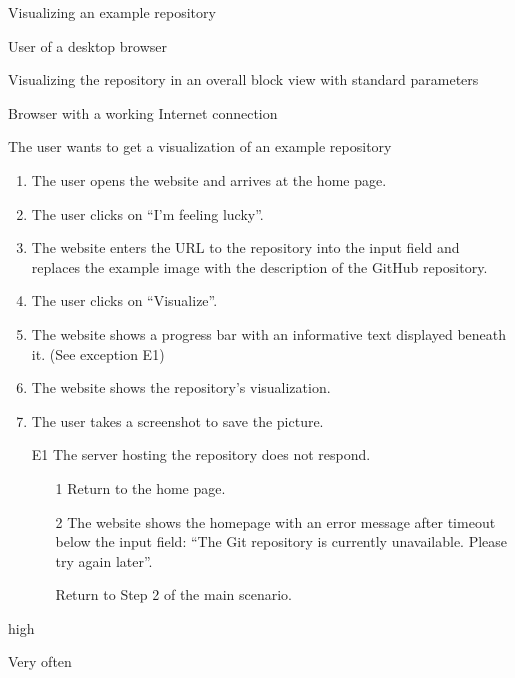 \documentclass[11pt]{scrartcl}
\begin{document}
\begin{description}[leftmargin=!,labelwidth=\widthof{\bfseries Frequency of use:}]
	\item[Use-case:] Visualizing an example repository 
	\item[Primary actor:] User of a desktop browser 
	\item[Goal in context:] Visualizing the repository in an overall block view with standard parameters 
	\item[Preconditions:] Browser with a working Internet connection
	\item[Trigger:] The user wants to get a visualization of an example repository

	\item[Scenario:]
		\begin{enumerate}[leftmargin=1.5em]
			\item The user opens the website and arrives at the home page.
			\item The user clicks on \enquote{I'm feeling lucky}.
			\item The website enters the URL to the repository into the input field and replaces the example image with the description of the GitHub repository.
			\item The user clicks on \enquote{Visualize}.
			\item The website shows a progress bar with an informative text displayed beneath
				it. (See exception E1)
			\item The website shows the repository's visualization.
			\item The user takes a screenshot to save the picture. 
		\end{enumerate}

	\item[Exceptions:]
		\begin{enumerate}[leftmargin=1.5em]
			\item[E1] The server hosting the repository does not respond.
				\begin{enumerate}
					\item[1] Return to the home page.
					\item[2] The website shows the homepage with an error message after timeout below the input 	
						field: 	\enquote{The Git repository is currently unavailable. Please try again later}.
					\item[] Return to Step 2 of the main scenario.
					
				\end{enumerate}
		\end{enumerate}

	\item[Priority:] high
	\item[Frequency of use:] Very often

\end{description}
\end{document}

